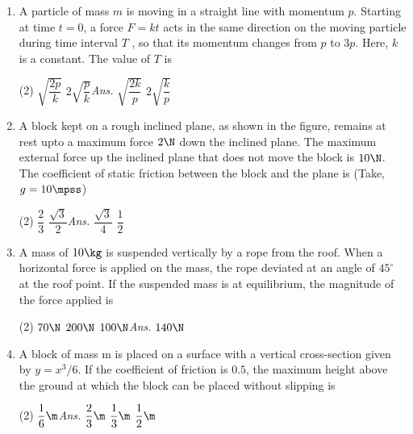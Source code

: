 \documentclass{article}
\newcommand{\ans}{\textcolor{red!95}{\textit{\quad Ans.}}}
\begin{document}
\begin{enumerate}
\item A particle of mass $m$ is moving in a straight line with momentum $p$. Starting at time $t = 0$, a force $F = kt$ acts in the same direction on the moving particle during time interval $T$ , so that its momentum changes from $p$ to $3p$. Here, $k$ is a constant. The value of $T$ is
\begin{tasks}(2)
	\task $\sqrt{\dfrac{2p}{k}}$
	\task $2\sqrt{\dfrac{p}{k}}$\ans
	\task $\sqrt{\dfrac{2k}{p}}$
	\task $2\sqrt{\dfrac{k}{p}}$
\end{tasks}

\item A block kept on a rough inclined plane, as shown in the figure, remains at rest upto a maximum force $2 \N$ down the inclined plane. The maximum external force up the inclined plane that does not move the block is $10 \N$. The coefficient of static friction between the block and the plane is (Take, $g = 10 \mpss$)
\begin{center}
\end{center}
\begin{tasks}(2)
	\task $\dfrac{2}{3}$
	\task $\dfrac{\sqrt{3}}{2}$\ans
	\task $\dfrac{\sqrt{3}}{4}$
	\task $\dfrac{1}{2}$
\end{tasks}


\item A mass of $10 \kg$ is suspended vertically by a rope from the roof. When a horizontal force is applied on the mass, the rope deviated at an angle of $45^\circ$ at the roof point. If the suspended mass is at equilibrium, the magnitude of the force applied is
\begin{tasks}(2)
	\task $70\N$
	\task $200\N$
	\task $100\N$\ans
	\task $140\N$
\end{tasks}


\item A block of mass m is placed on a surface with
a vertical cross-section given by $y = x^3 / 6$. If
the coefficient of friction is $0.5$, the maximum height above the ground at which the block can be placed without slipping is
\begin{tasks}(2)
	\task $\dfrac{1}{6}\m$\ans
	\task $\dfrac{2}{3}\m$
	\task $\dfrac{1}{3}\m$
	\task $\dfrac{1}{2}\m$
\end{tasks}


\end{enumerate}
\end{document}
